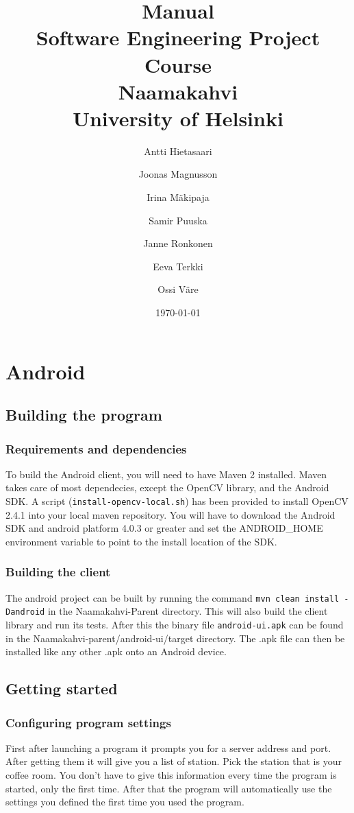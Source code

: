 \documentclass[11pt]{article}
\title{Manual\\
  Software Engineering Project Course\\
  Naamakahvi\\
  University of Helsinki}
\author{Antti Hietasaari
  \and Joonas Magnusson
  \and Irina Mäkipaja
  \and Samir Puuska
  \and Janne Ronkonen
  \and Eeva Terkki
  \and Ossi Väre}
\date{\today}
\begin{document}
\maketitle

\setcounter{tocdepth}{2}
\tableofcontents



\section{Android}
\subsection{Building the program}
\subsubsection*{Requirements and dependencies}
To build the Android client, you will need to have Maven 2 installed. Maven takes care of most dependecies, except the OpenCV library, and the Android SDK. A script (\texttt{install-opencv-local.sh}) has been provided to install OpenCV 2.4.1 into your local maven repository. You will have to download the Android SDK and android platform 4.0.3 or greater and set the ANDROID_HOME environment variable to point to the install location of the SDK.
\subsubsection*{Building the client}
The android project can be built by running the command \texttt{mvn clean install -Dandroid} in the Naamakahvi-Parent directory. This will also build the client library and run its tests. After this the binary file \texttt{android-ui.apk} can be found in the Naamakahvi-parent/android-ui/target directory. The .apk file can then be installed like any other .apk onto an Android device.
\subsection{Getting started}
\subsubsection*{Configuring program settings}
First after launching a program it prompts you for a server address and port. After getting them it will give you a list of station. Pick the station that is your coffee room. You don’t have to give this information every time the program is started, only the first time. After that the program will automatically use the settings you defined the first time you used the program.
\end{document}

